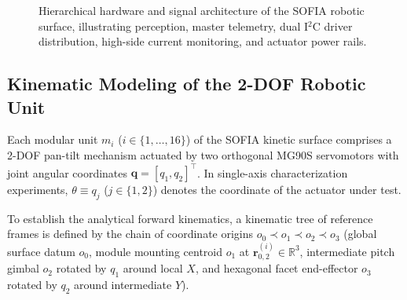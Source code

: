 \documentclass[lettersize,journal]{IEEEtran}
\begin{document}
\begin{figure}[!t]
		\caption{Hierarchical hardware and signal architecture of the SOFIA robotic surface, illustrating perception, master telemetry, dual I$^2$C driver distribution, high-side current monitoring, and actuator power rails.}
		\label{fig:block_architecture}
	\end{figure}
	
	\subsection{Kinematic Modeling of the 2-DOF Robotic Unit}
	\label{sec:module_kinematics}
	
	Each modular unit $m_i$ ($i \in \{1, \dots, 16\}$) of the SOFIA kinetic surface comprises a 2-DOF pan-tilt mechanism actuated by two orthogonal MG90S servomotors with joint angular coordinates $\mathbf{q} = [q_1, q_2]^\top$. In single-axis characterization experiments, $\theta \equiv q_j$ ($j \in \{1, 2\}$) denotes the coordinate of the actuator under test.
	
	To establish the analytical forward kinematics, a kinematic tree of reference frames is defined by the chain of coordinate origins $o_0 \prec o_1 \prec o_2 \prec o_3$ (global surface datum $o_0$, module mounting centroid $o_1$ at $\mathbf{r}_{0,2}^{(i)} \in \mathbb{R}^3$, intermediate pitch gimbal $o_2$ rotated by $q_1$ around local $X$, and hexagonal facet end-effector $o_3$ rotated by $q_2$ around intermediate $Y$).
	
\end{document}
